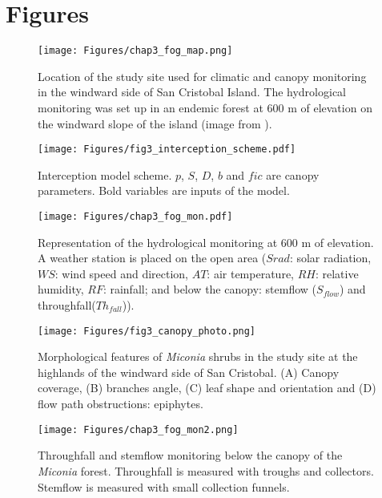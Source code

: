 \documentclass[a4paper,12pt]{article}
\begin{document}
\newpage
\section{Figures}

\begin{figure}[H] \centering
  \texttt{[image: Figures/chap3\_fog\_map.png]}
  \caption[Study site location for climatic monitoring at 600 m of elevation in San Cristobal]{Location of the study site used for climatic and canopy monitoring in the windward side of San Cristobal Island. The hydrological monitoring was set up in an endemic forest at 600 m of elevation on the windward slope of the island (image from \cite{IGM2014}).} \label{fig3:fog_map} 
\end{figure}

\begin{figure} \centering
  \texttt{[image: Figures/fig3\_interception\_scheme.pdf]}
  \caption[Interception model scheme]{Interception model scheme. $p$, $S$, $D$, $b$ and $fic$ are canopy parameters. Bold variables are inputs of the model.} \label{fig3:fog_scheme} 
\end{figure}



\begin{figure}[H] \centering
  \texttt{[image: Figures/chap3\_fog\_mon.pdf]}
  \caption[Representation of the hydrological monitoring at 600 m of elevation]{Representation of the hydrological monitoring at 600 m of elevation. A weather station is placed on the open area ($Srad$: solar radiation, $WS$: wind speed and direction, $AT$: air temperature, $RH$: relative humidity, $RF$: rainfall; and below the canopy:  stemflow ($S_{flow}$) and throughfall($Th_{fall}$)).} \label{fig3:fog_mon} 
\end{figure}

\begin{figure}[H] \centering
  \texttt{[image: Figures/fig3\_canopy\_photo.png]} 
  \caption[Morphological features of \emph{Miconia} shrubs]{Morphological features of \emph{Miconia} shrubs in the study site at the highlands of the windward side of San Cristobal. (A) Canopy coverage, (B) branches angle, (C) leaf shape and orientation and (D) flow path obstructions: epiphytes.} \label{fig3:fog_canopy} 
\end{figure}

\begin{figure}[H] \centering
  \texttt{[image: Figures/chap3\_fog\_mon2.png]}
  \caption[Throughfall and stemflow monitoring below the canopy of the \emph{Miconia} forest]{Throughfall and stemflow monitoring below the canopy of the \emph{Miconia} forest. Throughfall is measured with troughs and collectors. Stemflow is measured with small collection funnels.} \label{fig3:fog_mon2} 
\end{figure}
\end{document}
